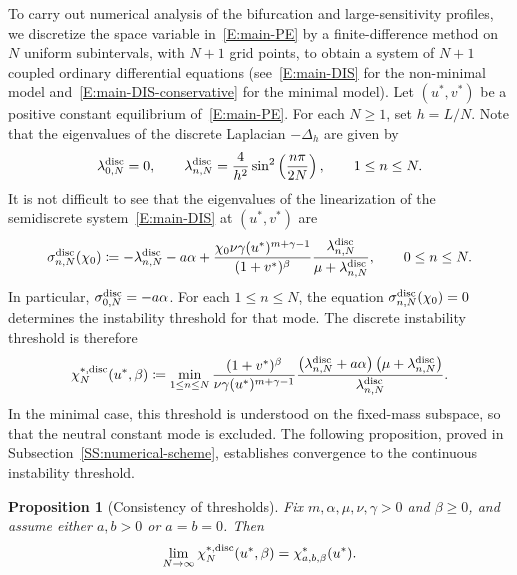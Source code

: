 \documentclass[11pt]{article} %
\newtheorem{proposition}{Proposition}[section]
\theoremstyle{remark}
\theoremstyle{remark}
\numberwithin{equation}{section}
\numberwithin{figure}{section}
\numberwithin{table}{section}
\begin{document}
To carry out numerical analysis of the bifurcation and large-sensitivity
profiles, we discretize the space variable in~\eqref{E:main-PE} by a
finite-difference method on $N$ uniform subintervals, with $N + 1$ grid points,
to obtain a system of $N + 1$ coupled ordinary differential equations
(see~\eqref{E:main-DIS} for the non-minimal model
and~\eqref{E:main-DIS-conservative} for the minimal model). Let $(u^*,v^*)$ be a
positive constant equilibrium of~\eqref{E:main-PE}. For each $N \ge 1$, set $h =
L/N$. Note that the eigenvalues of the discrete Laplacian $-\Delta_h$ are given
by
\begin{equation}\label{E:disc-eigenvalues}
  \lambda_{0,N}^{\rm disc}=0,
  \qquad
  \lambda_{n,N}^{\rm disc}
  =\frac{4}{h^2}\sin^2\left(\frac{n\pi}{2N}\right),
  \qquad 1\le n\le N.
\end{equation}
It is not difficult to see that the eigenvalues of the linearization of the
semidiscrete system~\eqref{E:main-DIS} at $(u^*,v^*)$ are
\begin{equation}\label{E:disc-growth-rates}
  \sigma_{n,N}^{\rm disc}(\chi_0)
  \coloneqq
  -\lambda_{n,N}^{\rm disc}-a\alpha
  +\frac{\chi_0\nu\gamma (u^*)^{m+\gamma-1}}
  {(1+v^*)^\beta}
  \frac{\lambda_{n,N}^{\rm disc}}
  {\mu+\lambda_{n,N}^{\rm disc}},
  \qquad 0\le n\le N.
\end{equation}
In particular, $\sigma_{0,N}^{\rm disc} = - a\alpha$. For each $1 \le n \le N$,
the equation $\sigma_{n,N}^{\rm disc}(\chi_0) = 0$ determines the instability
threshold for that mode. The discrete instability threshold is therefore
\begin{equation}\label{E:disc-threshold}
  \chi_N^{*,{\rm disc}}(u^*,\beta)
  \coloneqq
  \min_{1\le n\le N}
  \frac{(1+v^*)^\beta}{\nu\gamma (u^*)^{m+\gamma-1}}
  \frac{\left(\lambda_{n,N}^{\rm disc}+a\alpha\right)
  \left(\mu+\lambda_{n,N}^{\rm disc}\right)}
  {\lambda_{n,N}^{\rm disc}}.
\end{equation}
In the minimal case, this threshold is understood on the fixed-mass subspace, so
that the neutral constant mode is excluded. The following proposition, proved in
Subsection~\ref{SS:numerical-scheme}, establishes convergence to the continuous
instability threshold.
\begin{proposition}[Consistency of thresholds]\label{P:semidiscrete-threshold} Fix $m, \alpha, \mu, \nu, \gamma > 0$ and
  $\beta \ge 0$, and assume either $a, b > 0$ or $a = b = 0$. Then
  \begin{equation}\label{E:disctere-limit-eq}
    \lim_{N\to\infty}
    \chi_N^{*,{\rm disc}}(u^*,\beta)
    =
    \chi_{a,b,\beta}^*(u^*).
  \end{equation}
\end{proposition}
\end{document}
